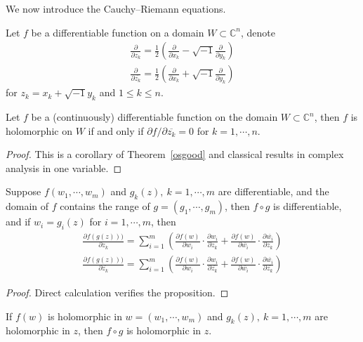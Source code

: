 We now introduce the Cauchy--Riemann equations.

\begin{sym}
    Let $f$ be a differentiable function on a domain $W\subset\mathbb{C}^n$, denote
    \begin{gather}
        \frac{\partial}{\partial z_k}=\frac{1}{2}\left(\frac{\partial}{\partial x_k}-\sqrt{-1}\frac{\partial}{\partial y_k}\right)\\
        \frac{\partial}{\partial\overline{z_k}}=\frac{1}{2}\left(\frac{\partial}{\partial x_k}+\sqrt{-1}\frac{\partial}{\partial y_k}\right)
    \end{gather}
    for $z_k=x_k+\sqrt{-1}y_k$ and $1\leq k\leq n$.
\end{sym}

\begin{thm}
    Let $f$ be a (continuously) differentiable function on the domain $W\subset\mathbb{C}^n$, then $f$ is holomorphic on $W$ if and only if $\partial{f}/\partial{\overline{z_k}}=0$ for $k=1,\cdots,n$.
\end{thm}
\begin{proof}
    This is a corollary of Theorem~\ref{osgood} and classical results in complex analysis in one variable.
\end{proof}

\begin{prop}
    Suppose $f(w_1,\cdots,w_m)$ and $g_k(z),\ k=1,\cdots,m$ are differentiable, and the domain of $f$ contains the range of $g=(g_1,\cdots,g_m)$, then $f\circ g$ is differentiable, and if $w_i=g_i(z)$ for $i=1,\cdots,m$, then
    \begin{gather*}
        \frac{\partial f(g(z)))}{\partial z_k}=\sum_{i=1}^m\left(\frac{\partial f(w)}{\partial w_i}\cdot\frac{\partial w_i}{\partial z_k}+\frac{\partial f(w)}{\partial\overline{w_i}}\cdot\frac{\partial\overline{w_i}}{\partial z_k}\right)\\
        \frac{\partial f(g(z)))}{\partial\overline{z_k}}=\sum_{i=1}^m\left(\frac{\partial f(w)}{\partial w_i}\cdot\frac{\partial w_i}{\partial\overline{z_k}}+\frac{\partial f(w)}{\partial\overline{w_i}}\cdot\frac{\partial\overline{w_i}}{\partial\overline{z_k}}\right)
    \end{gather*}
\end{prop}
\begin{proof}
    Direct calculation verifies the proposition.
\end{proof}

\begin{cor}
    If $f(w)$ is holomorphic in $w=(w_1,\cdots,w_m)$ and $g_k(z),\ k=1,\cdots,m$ are holomorphic in $z$, then $f\circ g$ is holomorphic in $z$.
\end{cor}

